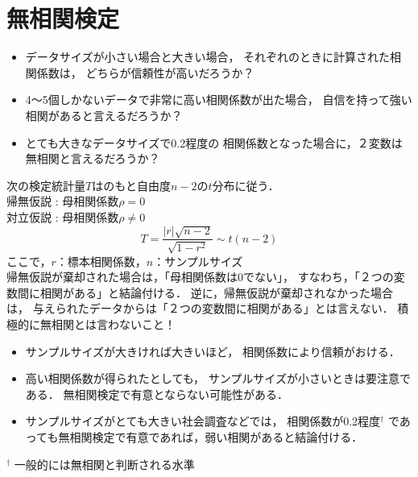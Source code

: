\newcommand{\Draft}{}
\newcommand{\Slide}{}
\newcommand{\PrintLecture}{1}
\newcommand{\PrintSolution}{1}








\maketitle

\MyFrame{}{\tableofcontents}

\section{無相関検定}

{
  \begin{itemize}
    \item データサイズが小さい場合と大きい場合，
      それぞれのときに計算された相関係数は，
      どちらが信頼性が高いだろうか？
    \item 4〜5個しかないデータで非常に高い相関係数が出た場合，
      自信を持って強い相関があると言えるだろうか？
    \item とても大きなデータサイズで0.2程度の
      相関係数となった場合に，２変数は無相関と言えるだろうか？
  \end{itemize}
}

{
  次の検定統計量$T$は\NH のもと自由度$n-2$の$t$分布に従う．\\
  帰無仮説 \NH : 母相関係数$\rho=0$\\
  対立仮説 \AH : 母相関係数$\rho\ne0$\\
  \[T=\frac{|r|\sqrt{n-2}}{\sqrt{1-r^2}}\sim t(n-2)\]
  ここで，$r$：標本相関係数，$n$：サンプルサイズ\\
  帰無仮説\NH が棄却された場合は，「母相関係数は0でない」，
  すなわち，「２つの変数間に相関がある」と結論付ける．
  逆に，帰無仮説が棄却されなかった場合は，
  与えられたデータからは「２つの変数間に相関がある」とは言えない．
  \alert{積極的に無相関とは言わないこと！}
}

{
  \begin{itemize}
    \item サンプルサイズが大きければ大きいほど，
      相関係数により信頼がおける．
    \item 高い相関係数が得られたとしても，
      サンプルサイズが小さいときは要注意である．
      無相関検定で有意とならない可能性がある． 
    \item サンプルサイズがとても大きい社会調査などでは，
  相関係数が0.2程度$^\dagger$
  であっても無相関検定で有意であれば，弱い相関があると結論付ける．
  \end{itemize}
  $^\dagger$ 一般的には無相関と判断される水準
}

